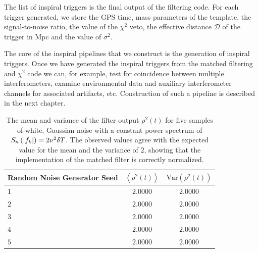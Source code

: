 The list of inspiral triggers is the final output of the filtering code. For
each trigger generated, we store the GPS time, mass parameters of the
template, the signal-to-noise ratio, the value of the $\chi^2$ veto, the
effective distance $\mathcal{D}$ of the trigger in Mpc and the value of
$\sigma^2$.

The core of the inspiral pipelines that we construct is the generation of
inspiral triggers. Once we have generated the inspiral triggers from the
matched filtering and $\chi^2$ code we can, for example, test for coincidence
between multiple interferometers, examine environmental data and auxiliary
interferometer channels for associated artifacts, etc.  Construction of such a
pipeline is described in
the next chapter.


\begin{table}[p]
  \begin{center}
  \begin{tabular}{l|c|c}
  Random Noise Generator Seed& $\left\langle \rho^2(t) \right\rangle$ & $\mathrm{Var}( \rho^2(t) )$\\
  \hline
  $1$ & $2.0000$ & $2.0000$ \\
  $2$ & $2.0000$ & $2.0000$ \\
  $3$ & $2.0000$ & $2.0000$ \\
  $4$ & $2.0000$ & $2.0000$ \\
  $5$ & $2.0000$ & $2.0000$ \\
  \end{tabular}
  \end{center}
  \caption{%
  The mean and variance of the filter output $\rho^2(t)$ for five samples of
  white, Gaussian noise with a constant power spectrum of $S_n\left(\left|f_{k}\right|\right) =
  2\nu^2\delta T$. The observed values agree with the expected value for the
  mean and the variance of $2$, showing that the implementation of the matched
  filter is correctly normalized. \color{red}{The results are currently fake.}
  }
\label{t:normresults}
\end{table}

